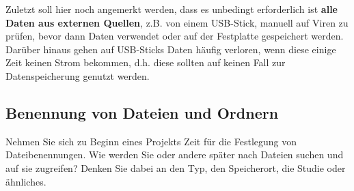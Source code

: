 Zuletzt soll hier noch angemerkt werden, dass es unbedingt erforderlich ist \textbf{alle Daten aus externen Quellen}, z.B. von einem USB-Stick, manuell auf Viren zu prüfen, bevor dann Daten verwendet oder auf der Festplatte gespeichert werden. Darüber hinaus gehen auf USB-Sticks Daten häufig verloren, wenn diese einige Zeit keinen Strom bekommen, d.h. diese sollten auf keinen Fall zur Datenspeicherung genutzt werden.

\subsection{Benennung von Dateien und Ordnern }

Nehmen Sie sich zu Beginn eines Projekts Zeit für die Festlegung von
Dateibenennungen. Wie werden Sie oder andere später nach Dateien suchen und auf
sie zugreifen? Denken Sie dabei an den Typ, den Speicherort, die Studie oder
ähnliches.
